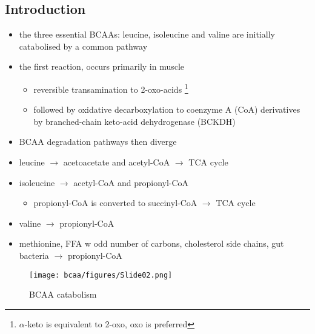 \documentclass[12pt]{scrartcl}
\begin{document}
\subsection{Introduction}
\label{sec:org2fc22dc}
\begin{itemize}
\item the three essential BCAAs: leucine, isoleucine and valine are
initially catabolised by a common pathway
\end{itemize}

\begin{center}
\chemnameinit{}
\hspace{20}
\chemnameinit{}
\hspace{20}
\chemnameinit{}
\end{center}

\begin{itemize}
\item the first reaction, occurs primarily in muscle
\begin{itemize}
\item reversible transamination to 2-oxo-acids \footnote{\(\alpha\)-keto is equivalent to 2-oxo, oxo is preferred}
\item followed by oxidative decarboxylation to coenzyme A (CoA)
derivatives by branched-chain keto-acid dehydrogenase
(BCKDH)
\end{itemize}
\item BCAA degradation pathways then diverge
\item leucine \(\to\) acetoacetate and acetyl-CoA \(\to\) TCA cycle
\item isoleucine \(\to\) acetyl-CoA and propionyl-CoA
\begin{itemize}
\item propionyl-CoA is converted to succinyl-CoA \(\to\) TCA cycle
\end{itemize}
\item valine \(\to\) propionyl-CoA
\item methionine, FFA w odd number of carbons, cholesterol side chains,
gut bacteria \(\to\) propionyl-CoA
\end{itemize}

\begin{figure}[htbp]
\centering
\texttt{[image: bcaa/figures/Slide02.png]}
\caption{\label{fig:org5183896}BCAA catabolism}
\end{figure}
\end{document}

